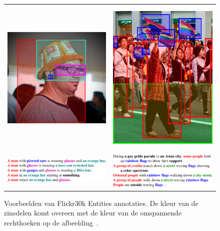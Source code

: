 \begin{figure}[!tb]
	\centering
	\begin{tabular}[t]{cc}
		\includegraphics[height=3.0in]{Images/example_hat.png} \vspace{-3mm}&
		\includegraphics[height=3.0in]{Images/example_parade.png}\\
		\includegraphics[valign = T,width=.4\columnwidth]{Images/example_hat_text.pdf}&
		\includegraphics[valign = T,width=.4\columnwidth]{Images/example_parade_text.pdf}
		\end{tabular}
		\caption[Voorbeelden van Flickr30k Entities annotaties]{Voorbeelden van Flickr30k Entities annotaties. De kleur van de zinsdelen komt overeen met de kleur van de omspannende rechthoeken op de afbeelding~\cite{Plummer2015}.}
		\label{fig:entities}
		\end{figure}
		
